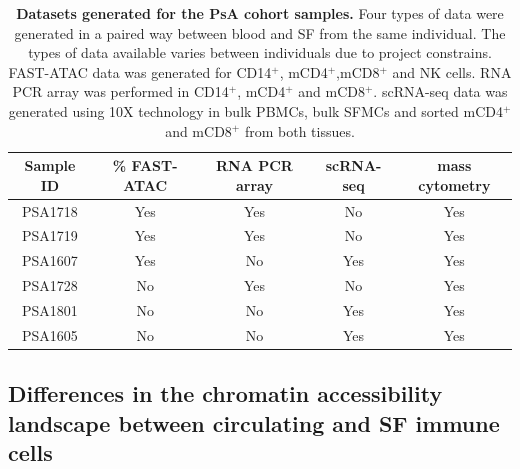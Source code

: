 \begin{table}[htbp]
\centering
\begin{tabular}{@{} c c c c c}
\toprule
\textbf{Sample ID} & \textbf{\% FAST-ATAC} & \textbf{RNA PCR array} & \textbf{scRNA-seq} & \textbf{mass cytometry} \\
\midrule
\midrule
PSA1718 & Yes & Yes & No & Yes\\
PSA1719 & Yes & Yes & No & Yes\\
PSA1607 & Yes & No & Yes & Yes\\
PSA1728 & No & Yes & No & Yes\\
PSA1801 & No & No & Yes & Yes\\
PSA1605 & No & No & Yes & Yes\\
\bottomrule
\end{tabular}
\medskip %
\caption[Datasets generated for the PsA cohort samples]{\textbf{Datasets generated for the PsA cohort samples.} Four types of data were generated in a paired way between blood and SF from the same individual. The types of data available varies between individuals due to project constrains. FAST-ATAC data was generated for CD14$^+$, mCD4$^+$,mCD8$^+$ and NK cells. RNA PCR array was performed in CD14$^+$, mCD4$^+$ and mCD8$^+$. scRNA-seq data was generated using 10X technology in bulk PBMCs, bulk SFMCs and sorted mCD4$^+$ and mCD8$^+$ from both tissues.}
\label{tab:PSA_datasets_per_sample}
\end{table}
\bigskip %


\subsection{Differences in the chromatin accessibility landscape between circulating and SF immune cells}

